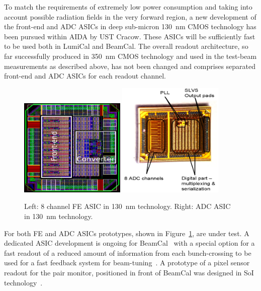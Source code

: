 To match the requirements of extremely low power consumption and taking into account possible radiation
fields in the very forward region, a new development of the front-end and ADC ASICs in deep sub-micron
\SI{130}{nm} CMOS technology has been
pursued within AIDA by UST Cracow.
These ASICs will be sufficiently fast to be used both in LumiCal and BeamCal.
The overall readout architecture, so far successfully produced in \SI{350}{nm} CMOS technology and used in the test-beam
measurements as described above, has not been changed and comprises separated front-end
and ADC ASICs for each readout channel.
\begin{figure}[hbp]
\centering
    \includegraphics[width=0.45\textwidth]{Calorimeter/FCAL/figs/FE_ASIC.png} \hfill
	\includegraphics[width=0.45\textwidth]{Calorimeter/FCAL/figs/ADC_ASIC_2.png}
	\caption{Left: 8 channel FE ASIC in \SI{130}{nm} technology.
		 	 Right: ADC ASIC in \SI{130}{nm} technology.}
    \label{fig:ASIC_ADC}
\end{figure}
For both FE and ADC ASICs prototypes, shown in Figure~\ref{fig:ASIC_ADC}, are under test.
A dedicated ASIC development is ongoing for BeamCal~\cite{6200898}
with a special option for a fast readout of a reduced amount of
information from each bunch-crossing to be used for a fast feedback system for beam-tuning~\cite{1748-0221-3-10-P10004}.
A prototype of a pixel sensor readout for the pair monitor, positioned in front of BeamCal was designed in SoI
technology~\cite{Sato201153}.



